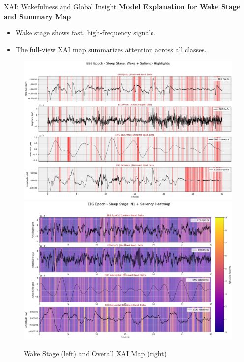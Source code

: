 \begin{frame}{XAI: Wakefulness and Global Insight}
	\textbf{Model Explanation for Wake Stage and Summary Map}
	\vspace{0.3cm}
	
	\begin{itemize}
		\item Wake stage shows fast, high-frequency signals.
		\item The full-view XAI map summarizes attention across all classes.
	\end{itemize}
	
	\begin{figure}
		\centering
		\includegraphics[width=0.45\linewidth]{images/paper_3/stagewake.png}
		\includegraphics[width=0.45\linewidth]{images/paper_3/XAI4.png}
		\caption{Wake Stage (left) and Overall XAI Map (right)}
	\end{figure}
\end{frame}


 



